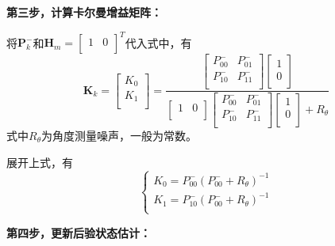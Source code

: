\textbf{第三步，计算卡尔曼增益矩阵：}

将$\boldsymbol{P}_{k}^{-}$和$\boldsymbol{H}_m=\left[ \begin{matrix}1&0\\\end{matrix} \right] ^T$代入式中，有
$$
\boldsymbol{K}_k=\left[ \begin{array}{c}
	K_{0}\\
	K_{1}\\
\end{array} \right] =\frac{\left[ \begin{matrix}
	P_{00}^{-}&		P_{01}^{-}\\
	P_{10}^{-}&		P_{11}^{-}\\
\end{matrix} \right] \left[ \begin{array}{c}
	1\\
	0\\
\end{array} \right]}{\left[ \begin{matrix}
	1&		0\\
\end{matrix} \right] \left[ \begin{matrix}
	P_{00}^{-}&		P_{01}^{-}\\
	P_{10}^{-}&		P_{11}^{-}\\
\end{matrix} \right] \left[ \begin{array}{c}
	1\\
	0\\
\end{array} \right] +R_{\theta}}
$$
式中$R_{\theta}$为角度测量噪声，一般为常数。

展开上式，有
$$
\left\{ \begin{array}{l}
	K_{0}=P_{00}^{-}(P_{00}^{-}+R_{\theta})^{-1}\\
	K_{1}=P_{10}^{-}(P_{00}^{-}+R_{\theta})^{-1}\\
\end{array} \right. 
$$

\textbf{第四步，更新后验状态估计：}

